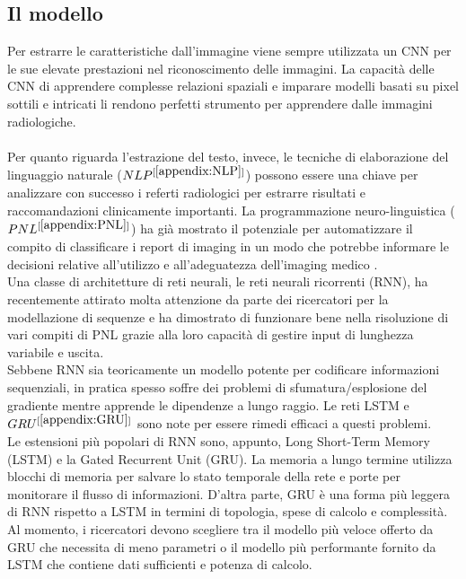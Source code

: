 \documentclass[12pt,a4paper]{report}
\begin{document}
\subsection{Il modello}
Per estrarre le caratteristiche dall’immagine viene sempre utilizzata un CNN per le sue elevate prestazioni nel riconoscimento delle immagini. La capacità delle CNN di apprendere complesse relazioni spaziali e
imparare modelli basati su pixel sottili e intricati li rendono perfetti strumento per apprendere dalle immagini radiologiche. \\
\\
Per quanto riguarda l'estrazione del testo, invece, le tecniche di elaborazione del linguaggio naturale ($NLP^{[\ref{appendix:NLP}]}$) possono essere una chiave per analizzare con successo i referti radiologici per estrarre risultati e raccomandazioni clinicamente importanti. La programmazione neuro-linguistica ($PNL^{[\ref{appendix:PNL}]}$) ha già mostrato il potenziale per automatizzare il compito di classificare i report di imaging in un modo che potrebbe informare le decisioni relative all'utilizzo e all'adeguatezza dell'imaging medico \cite{banerjee2019comparative}.\\
Una classe di architetture di reti neurali, le reti neurali ricorrenti (RNN), ha recentemente attirato molta attenzione da parte dei ricercatori per la modellazione di sequenze e ha dimostrato di funzionare bene nella risoluzione di vari compiti di PNL grazie alla loro capacità di gestire input di lunghezza variabile e uscita.\\
Sebbene RNN sia teoricamente un modello potente per codificare informazioni sequenziali, in pratica spesso soffre dei problemi di sfumatura/esplosione del gradiente mentre apprende le dipendenze a lungo raggio. Le reti LSTM e $GRU^{[\ref{appendix:GRU}]}$ sono note per essere rimedi efficaci a questi problemi.\\
Le estensioni più popolari di RNN sono, appunto, Long Short-Term Memory (LSTM) e la Gated Recurrent Unit (GRU). La memoria a lungo termine utilizza blocchi di memoria per salvare lo stato temporale della rete e porte per monitorare il flusso di informazioni. D'altra parte, GRU è una forma più leggera di RNN rispetto a LSTM in termini di topologia, spese di calcolo e complessità. Al momento, i ricercatori devono scegliere tra il modello più veloce offerto da GRU che necessita di meno parametri o il modello più performante fornito da LSTM che contiene dati sufficienti e potenza di calcolo.\\
\end{document}
